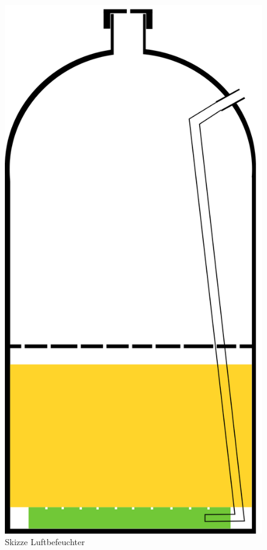 \begin{figure}[h]
	\begin{center}
		\includegraphics[scale=0.6]{Luftbefeuchter.png}
		\caption{Skizze Luftbefeuchter}
	\end{center}
\end{figure}


